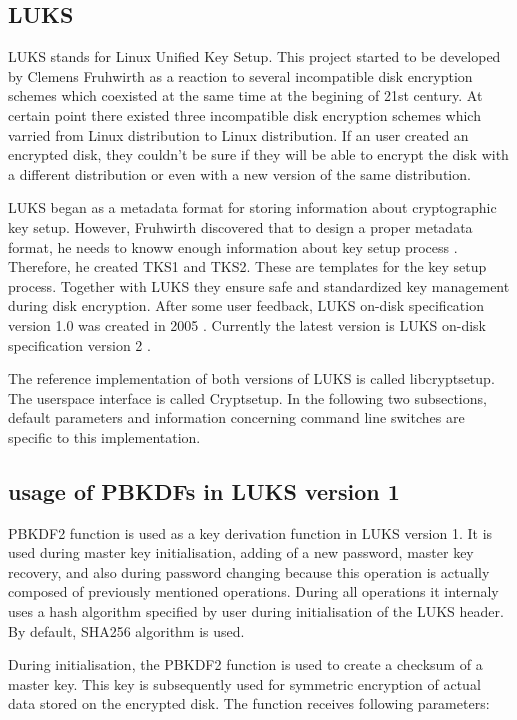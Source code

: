 \documentclass[nolof]{fithesis3}
\begin{document}
\subsection{LUKS}
LUKS stands for Linux Unified Key Setup. This project started to be developed by Clemens Fruhwirth as a reaction to several incompatible disk encryption schemes which coexisted at the same time at the begining of 21st century. At certain point there existed three incompatible disk encryption schemes which varried from Linux distribution to Linux distribution. If an user created an encrypted disk, they couldn't be sure if they will be able to encrypt the disk with a different distribution or even with a new version of the same distribution.

LUKS began as a metadata format for storing information about cryptographic key setup. However, Fruhwirth discovered that to design a proper metadata format, he needs to knoww enough information about key setup process \parencite{newmethods}. Therefore, he created TKS1 and TKS2. These are templates for the key setup process. Together with LUKS they ensure safe and standardized key management during disk encryption. After some user feedback, LUKS on-disk specification version 1.0 was created in 2005 \parencite{luks1}. Currently the latest version is LUKS on-disk specification version 2 \parencite{luks2}.

The reference implementation of both versions of LUKS is called libcryptsetup. The userspace interface is called Cryptsetup. In the following two subsections, default parameters and information concerning command line switches are specific to this implementation.

\subsection{usage of PBKDFs in LUKS version 1}
\label{luks1}
PBKDF2 function is used as a key derivation function in LUKS version 1. It is used during master key initialisation, adding of a new password, master key recovery, and also during password changing because this operation is actually composed of previously mentioned operations. During all operations it internaly uses a hash algorithm specified by user during initialisation of the LUKS header. By default, SHA256 algorithm is used.

During initialisation, the PBKDF2 function is used to create a checksum of a master key. This key is subsequently used for symmetric encryption of actual data stored on the encrypted disk. The function receives following parameters:
\end{document}
